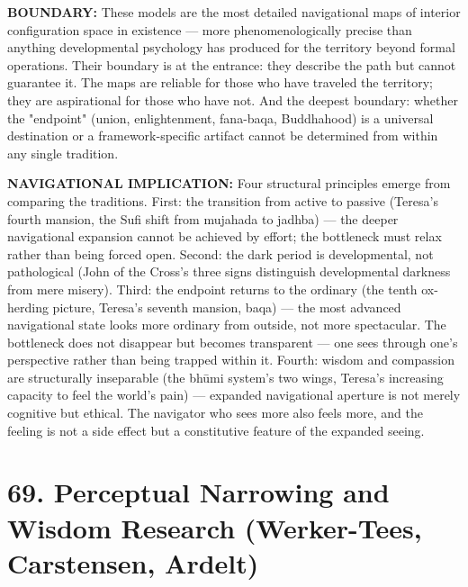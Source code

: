 \textbf{BOUNDARY:} These models are the most detailed navigational maps of interior configuration space in existence — more phenomenologically precise than anything developmental psychology has produced for the territory beyond formal operations. Their boundary is at the entrance: they describe the path but cannot guarantee it. The maps are reliable for those who have traveled the territory; they are aspirational for those who have not. And the deepest boundary: whether the "endpoint" (union, enlightenment, fana-baqa, Buddhahood) is a universal destination or a framework-specific artifact cannot be determined from within any single tradition.


\textbf{NAVIGATIONAL IMPLICATION:} Four structural principles emerge from comparing the traditions. First: the transition from active to passive (Teresa's fourth mansion, the Sufi shift from mujahada to jadhba) — the deeper navigational expansion cannot be achieved by effort; the bottleneck must relax rather than being forced open. Second: the dark period is developmental, not pathological (John of the Cross's three signs distinguish developmental darkness from mere misery). Third: the endpoint returns to the ordinary (the tenth ox-herding picture, Teresa's seventh mansion, baqa) — the most advanced navigational state looks more ordinary from outside, not more spectacular. The bottleneck does not disappear but becomes transparent — one sees through one's perspective rather than being trapped within it. Fourth: wisdom and compassion are structurally inseparable (the bhūmi system's two wings, Teresa's increasing capacity to feel the world's pain) — expanded navigational aperture is not merely cognitive but ethical. The navigator who sees more also feels more, and the feeling is not a side effect but a constitutive feature of the expanded seeing.


\bigskip\noindent\makebox[\textwidth]{\color{rulegray}\rule{5cm}{0.3pt}}\bigskip


\section*{69. Perceptual Narrowing and Wisdom Research (Werker-Tees, Carstensen, Ardelt)}


